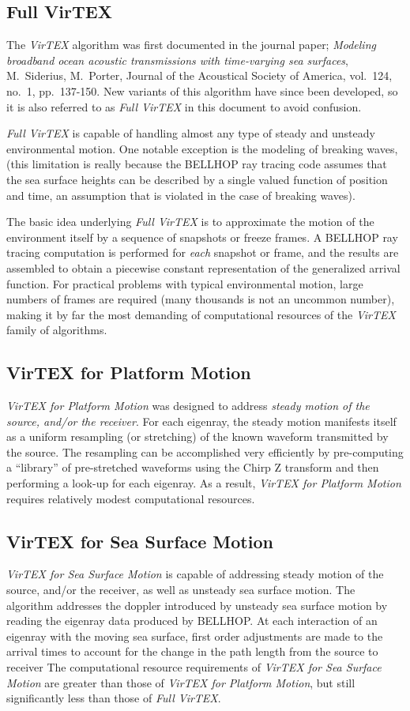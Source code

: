 \documentclass[12pt, letterpaper, oneside]{article}
\begin{document}
\subsection{Full VirTEX}
The {\em VirTEX} algorithm was first documented in the journal paper;
{\em Modeling broadband ocean acoustic transmissions with time-varying
sea surfaces}, M.~Siderius, M.~Porter, Journal of the Acoustical Society
of America, vol.~124, no.~1, pp.~137-150. New variants of this algorithm
have since been developed, so it is also referred to as {\em Full VirTEX}
in this document to avoid confusion.

{\em Full VirTEX} is capable of handling almost any type of steady and
unsteady environmental motion. One notable exception is the modeling
of breaking waves, (this limitation is really because the BELLHOP ray
tracing code assumes that the sea surface heights can be described by
a single valued function of position and time, an assumption that is
violated in the case of breaking waves).

The basic idea underlying {\em Full VirTEX} is to approximate the
motion of the environment itself by a sequence of snapshots or freeze
frames. A BELLHOP ray tracing computation is performed for {\em each}
snapshot or frame, and the results are assembled to obtain a piecewise
constant representation of the generalized arrival function. For practical
problems with typical environmental motion, large numbers of frames
are required (many thousands is not an uncommon number), making it by
far the most demanding of computational resources of the {\em VirTEX}
family of algorithms.

\subsection{VirTEX for Platform Motion}
{\em VirTEX for Platform Motion} was designed to address {\em steady
motion of the source, and/or the receiver}.  For each eigenray, the
steady motion manifests itself as a uniform resampling (or stretching)
of the known waveform transmitted by the source.  The resampling can
be accomplished very efficiently by pre-computing a ``library'' of
pre-stretched waveforms using the Chirp Z transform and then performing a
look-up for each eigenray. As a result, {\em VirTEX for Platform Motion}
requires relatively modest computational resources.

\subsection{VirTEX for Sea Surface Motion}
{\em VirTEX for Sea Surface Motion} is capable of addressing steady
motion of the source, and/or the receiver, as well as unsteady sea surface
motion.  The algorithm addresses the doppler introduced by unsteady
sea surface motion by reading the eigenray data produced by BELLHOP. At
each interaction of an eigenray with the moving sea surface, first order
adjustments are made to the arrival times to account for the change in
the path length from the source to receiver The computational resource
requirements of {\em VirTEX for Sea Surface Motion} are greater than
those of {\em VirTEX for Platform Motion}, but still significantly less
than those of {\em Full VirTEX}.
\end{document}
